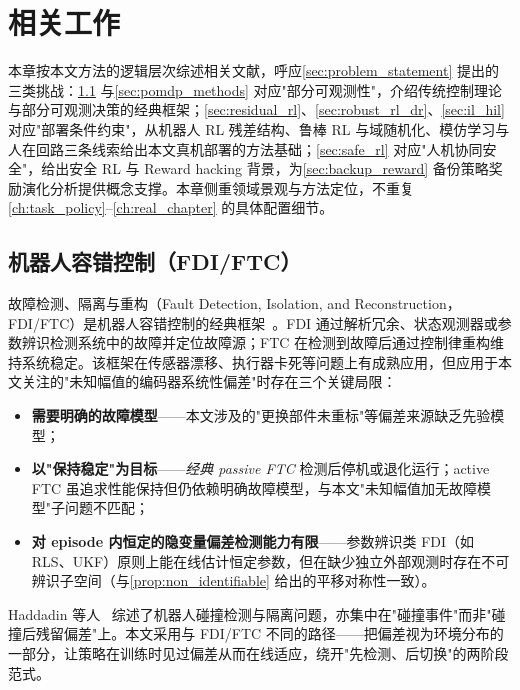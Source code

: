 
\chapter{相关工作}\label{ch:related_work}

本章按本文方法的逻辑层次综述相关文献，呼应\cref{sec:problem_statement} 提出的三类挑战：\cref{sec:ftc} 与\cref{sec:pomdp_methods} 对应"部分可观测性"，介绍传统控制理论与部分可观测决策的经典框架；\cref{sec:residual_rl}、\cref{sec:robust_rl_dr}、\cref{sec:il_hil} 对应"部署条件约束"，从机器人 RL 残差结构、鲁棒 RL 与域随机化、模仿学习与人在回路三条线索给出本文真机部署的方法基础；\cref{sec:safe_rl} 对应"人机协同安全"，给出安全 RL 与 Reward hacking 背景，为\cref{sec:backup_reward} 备份策略奖励演化分析提供概念支撑。本章侧重领域景观与方法定位，不重复\cref{ch:task_policy}–\cref{ch:real_chapter} 的具体配置细节。

\section{机器人容错控制（FDI/FTC）}\label{sec:ftc}

故障检测、隔离与重构（Fault Detection, Isolation, and Reconstruction，FDI/FTC）是机器人容错控制的经典框架~\cite{blanke2016diagnosis}。FDI 通过解析冗余、状态观测器或参数辨识检测系统中的故障并定位故障源；FTC 在检测到故障后通过控制律重构维持系统稳定。该框架在传感器漂移、执行器卡死等问题上有成熟应用，但应用于本文关注的"未知幅值的编码器系统性偏差"时存在三个关键局限：

\begin{itemize}
  \item \textbf{需要明确的故障模型}——本文涉及的"更换部件未重标"等偏差来源缺乏先验模型；
  \item \textbf{以"保持稳定"为目标}——\emph{经典 passive FTC} 检测后停机或退化运行；active FTC 虽追求性能保持但仍依赖明确故障模型，与本文"未知幅值加无故障模型"子问题不匹配；
  \item \textbf{对 episode 内恒定的隐变量偏差检测能力有限}——参数辨识类 FDI（如 RLS、UKF）原则上能在线估计恒定参数，但在缺少独立外部观测时存在不可辨识子空间（与\cref{prop:non_identifiable} 给出的平移对称性一致）。
\end{itemize}

\noindent Haddadin 等人~\cite{haddadin2017robot} 综述了机器人碰撞检测与隔离问题，亦集中在"碰撞事件"而非"碰撞后残留偏差"上。本文采用与 FDI/FTC 不同的路径——把偏差视为环境分布的一部分，让策略在训练时见过偏差从而在线适应，绕开"先检测、后切换"的两阶段范式。

